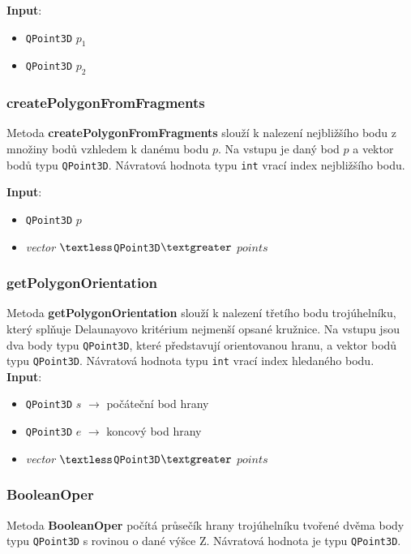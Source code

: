 \documentclass[a4paper, 12pt]{article}
\begin{document}
\textbf{Input}:
\begin{itemize}
\item \texttt{QPoint3D} $p_1$ 
\item \texttt{QPoint3D} $p_2$
\end{itemize}

\subsubsection*{createPolygonFromFragments}
Metoda \textbf{createPolygonFromFragments} slouží k nalezení nejbližšího bodu z množiny bodů vzhledem k danému bodu $p$. Na vstupu je daný bod $p$ a vektor bodů typu \texttt{QPoint3D}. Návratová hodnota typu \texttt{int} vrací index nejbližšího bodu.

\textbf{Input}:
\begin{itemize}
\item \texttt{QPoint3D} $p$ 
\item \textsl{vector} $\textless$\texttt{QPoint3D}$\textgreater$ $points$
\end{itemize}

\subsubsection*{getPolygonOrientation}
Metoda \textbf{getPolygonOrientation} slouží k nalezení třetího bodu trojúhelníku, který splňuje Delaunayovo kritérium nejmenší opsané kružnice. Na vstupu jsou dva body typu \texttt{QPoint3D}, které představují orientovanou hranu, a vektor bodů typu \texttt{QPoint3D}. Návratová hodnota typu \texttt{int} vrací index hledaného bodu.\\

\textbf{Input}:
\begin{itemize}
\item \texttt{QPoint3D} $s$ $\rightarrow$ počáteční bod hrany
\item \texttt{QPoint3D} $e$ $\rightarrow$ koncový bod hrany
\item \textsl{vector} $\textless$\texttt{QPoint3D}$\textgreater$ $points$
\end{itemize}

\subsubsection*{BooleanOper}
Metoda \textbf{BooleanOper} počítá průsečík hrany trojúhelníku tvořené dvěma body typu \texttt{QPoint3D} s rovinou o dané výšce Z. Návratová hodnota je typu \texttt{QPoint3D}.\\
\end{document}
